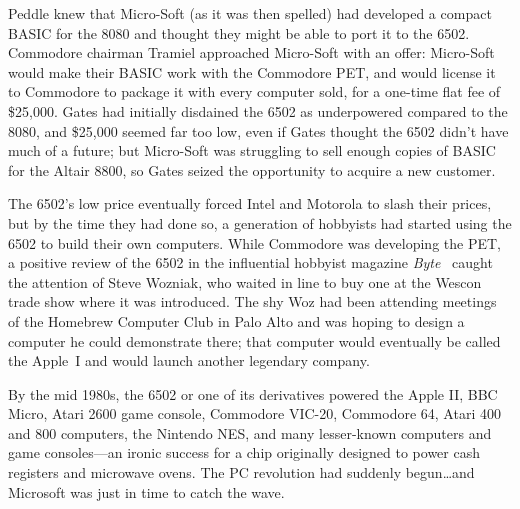 Peddle knew that Micro-Soft (as it was then spelled) 
had developed a compact BASIC for the 8080
and thought they might be able to port it to the 6502.
Commodore chairman Tramiel approached Micro-Soft with an offer:
Micro-Soft would make their BASIC work with the Commodore PET, and would
license it to Commodore to package it with every computer sold, for a
one-time flat fee of \$25,000.
Gates had initially disdained the 6502 as underpowered compared to the
8080, and \$25,000 seemed far too low, even if Gates thought the 6502
didn't have much of a future; but Micro-Soft was struggling to
sell enough copies of BASIC for the Altair 8800, so Gates
seized the opportunity to acquire a new customer.


The 6502's low price eventually forced Intel and Motorola to slash their
prices, but by the time they had done so, a generation of hobbyists had
started using the 6502 to build their own computers.
While Commodore was developing the PET,
a positive review of the 6502 in
the influential hobbyist magazine \emph{Byte}~\cite{byte75:6502} caught
the attention of Steve Wozniak, who waited in line to buy one
at the Wescon trade show where it was introduced.
The shy Woz had been attending meetings of the Homebrew Computer Club in
Palo Alto and was hoping to design a computer he could demonstrate
there; that computer would eventually be called the Apple~I and would
launch another legendary company.

By the mid 1980s, the 6502 or one of its derivatives powered the Apple
II, BBC Micro, Atari 2600 game console, Commodore VIC-20, Commodore 64,
Atari 400 and 800 computers, the Nintendo NES, and many lesser-known
computers and game consoles---an ironic success for a chip
originally designed to power cash registers and microwave ovens.
The PC revolution had suddenly begun\ldots{}and Microsoft was just in time
to catch the wave.


